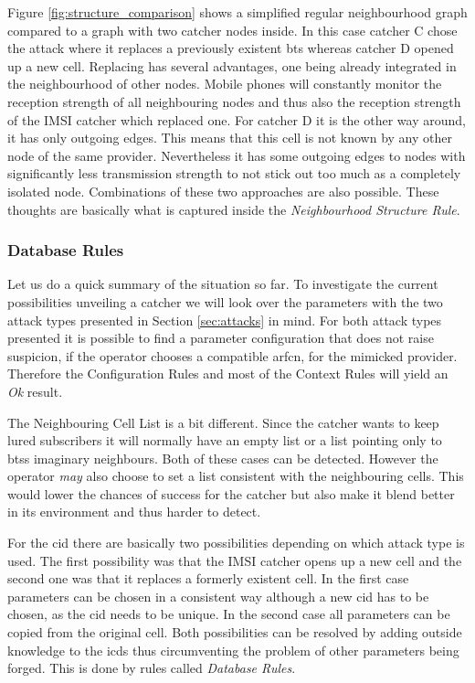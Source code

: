 Figure \ref{fig:structure_comparison} shows a simplified regular neighbourhood graph compared to a graph with two catcher nodes inside.
In this case catcher C chose the attack where it replaces a previously existent \gls{bts} whereas catcher D opened up a new cell.
Replacing has several advantages, one being already integrated in the neighbourhood of other nodes.
Mobile phones will constantly monitor the reception strength of all neighbouring nodes and thus also the reception strength of the IMSI catcher which replaced one.
For catcher D it is the other way around, it has only outgoing edges.
This means that this cell is not known by any other node of the same provider.
Nevertheless it has some outgoing edges to nodes with significantly less transmission strength to not stick out too much as a completely isolated node.
Combinations of these two approaches are also possible.
These thoughts are basically what is captured inside the \emph{Neighbourhood Structure Rule}.

\subsubsection{Database Rules}
Let us do a quick summary of the situation so far.
To investigate the current possibilities unveiling a catcher we will look over the parameters with the two attack types presented in Section \ref{sec:attacks} in mind.
For both attack types presented it is possible to find a parameter configuration that does not raise suspicion, if the operator chooses a compatible \gls{arfcn}, \etc for the mimicked provider.
Therefore the Configuration Rules and most of the Context Rules will yield an \emph{Ok} result.

The Neighbouring Cell List is a bit different.
Since the catcher wants to keep lured subscribers it will normally have an empty list or a list pointing only to \glspl{bts} imaginary neighbours. 
Both of these cases can be detected.
However the operator \emph{may} also choose to set a list consistent with the neighbouring cells.
This would lower the chances of success for the catcher but also make it blend better in its environment and thus harder to detect.
 
For the \gls{cid} there are basically two possibilities depending on which attack type is used.
The first possibility was that the IMSI catcher opens up a new cell and the second one was that it replaces a formerly existent cell.
In the first case parameters can be chosen in a consistent way although a new \gls{cid} has to be chosen, as the \gls{cid} needs to be unique.
In the second case all parameters can be copied from the original cell.
Both possibilities can be resolved by adding outside knowledge to the \gls{icds} thus circumventing the problem of other parameters being forged.
This is done by rules called \emph{Database Rules}.


